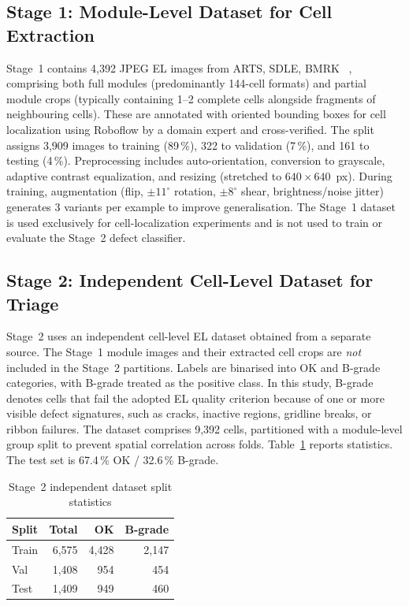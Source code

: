 \documentclass[conference]{IEEEtran}
\begin{document}
\subsection{Stage 1: Module-Level Dataset for Cell Extraction}
Stage~1 contains 4{,}392 JPEG EL images from ARTS, SDLE, BMRK ~\cite{pratt2023benchmark}, comprising both full modules (predominantly 144-cell formats) and partial module crops (typically containing 1--2 complete cells alongside fragments of neighbouring cells). These are annotated with oriented bounding boxes for cell localization using Roboflow by a domain expert and cross-verified. The split assigns 3{,}909 images to training (89\,\%), 322 to validation (7\,\%), and 161 to testing (4\,\%). Preprocessing includes auto-orientation, conversion to grayscale, adaptive contrast equalization, and resizing (stretched to $640\times640$~px). During training, augmentation (flip, $\pm11^\circ$ rotation, $\pm8^\circ$ shear, brightness/noise jitter) generates 3 variants per example to improve generalisation. The Stage~1 dataset is used exclusively for cell-localization experiments and is not used to train or evaluate the Stage~2 defect classifier.

\subsection{Stage 2: Independent Cell-Level Dataset for Triage}
Stage~2 uses an independent cell-level EL dataset obtained from a separate source. The Stage~1 module images and their extracted cell crops are \textit{not} included in the Stage~2 partitions. Labels are binarised into OK and B-grade categories, with B-grade treated as the positive class. In this study, B-grade denotes cells that fail the adopted EL quality criterion because of one or more visible defect signatures, such as cracks, inactive regions, gridline breaks, or ribbon failures. The dataset comprises 9{,}392 cells, partitioned with a module-level group split to prevent spatial correlation across folds. Table~\ref{tab:datasplit} reports statistics. The test set is 67.4\,\% OK / 32.6\,\% B-grade.

\begin{table}[t]
  \caption{Stage~2 independent dataset split statistics}
  \label{tab:datasplit}
  \begin{center}
  \renewcommand{\arraystretch}{0.95}\small
  \begin{tabular}{lrrr}
    \toprule
    \textbf{Split} & \textbf{Total} & \textbf{OK} & \textbf{B-grade}\\
    \midrule
    Train & 6{,}575 & 4{,}428 & 2{,}147\\
    Val   & 1{,}408 &   954   &   454\\
    Test  & 1{,}409 &   949   &   460\\
    \bottomrule
  \end{tabular}
  \end{center}
\end{table}
\end{document}
